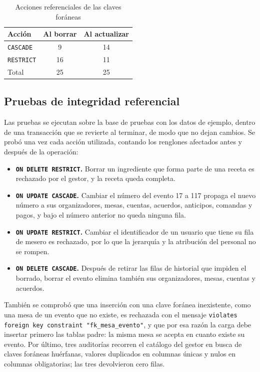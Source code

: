 \begin{table}[H]
    \centering
    \small
    \begin{tabular}{lcc}
        \toprule
        \textbf{Acción} & \textbf{Al borrar} & \textbf{Al actualizar} \\
        \midrule
        \texttt{CASCADE} & 9 & 14 \\
        \texttt{RESTRICT} & 16 & 11 \\
        \midrule
        Total & 25 & 25 \\
        \bottomrule
    \end{tabular}
    \captionsetup{labelfont=bf, textfont=it, labelsep=newline, justification=raggedright, singlelinecheck=false}
    \caption{Acciones referenciales de las claves foráneas}
    \label{tab:acciones}
\end{table}

\subsection{Pruebas de integridad referencial}

Las pruebas se ejecutan sobre la base de pruebas con los datos de ejemplo, dentro de una transacción que se revierte al terminar, de modo que no dejan cambios. Se probó una vez cada acción utilizada, contando los renglones afectados antes y después de la operación:

\begin{itemize}
    \item \textbf{\texttt{ON DELETE RESTRICT}.} Borrar un ingrediente que forma parte de una receta es rechazado por el gestor, y la receta queda completa.
    \item \textbf{\texttt{ON UPDATE CASCADE}.} Cambiar el número del evento 17 a 117 propaga el nuevo número a sus organizadores, mesas, cuentas, acuerdos, anticipos, comandas y pagos, y bajo el número anterior no queda ninguna fila.
    \item \textbf{\texttt{ON UPDATE RESTRICT}.} Cambiar el identificador de un usuario que tiene su fila de mesero es rechazado, por lo que la jerarquía y la atribución del personal no se rompen.
    \item \textbf{\texttt{ON DELETE CASCADE}.} Después de retirar las filas de historial que impiden el borrado, borrar el evento elimina también sus organizadores, mesas, cuentas y acuerdos.
\end{itemize}

También se comprobó que una inserción con una clave foránea inexistente, como una mesa de un evento que no existe, es rechazada con el mensaje \texttt{violates foreign key constraint "fk\_mesa\_evento"}, y que por esa razón la carga debe insertar primero las tablas padre: la misma mesa se acepta en cuanto existe su evento. Por último, tres auditorías recorren el catálogo del gestor en busca de claves foráneas huérfanas, valores duplicados en columnas únicas y nulos en columnas obligatorias; las tres devolvieron cero filas.

